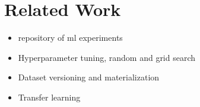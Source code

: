 \section{Related Work} \label{sec-related-work}
\begin{itemize}
\item repository of ml experiments
\item Hyperparameter tuning, random and grid search
\item Dataset versioning and materialization \cite{bhattacherjee2015principles, vartak2018mistique}
\item Transfer learning
\end{itemize}


